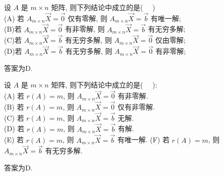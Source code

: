\begin{eg}
设 $A$ 是 $m\times n$ 矩阵,  则下列结论中成立的是(    \ \     )  \\
(A) 若 $A_{m\times n}\vec{X}=\vec{0}$ 仅有零解,   则 $A_{m\times n}\vec{X}=\vec{b}$ 有唯一解;\\
(B)若 $A_{m\times n}\vec{X}=\vec{0}$ 有非零解,   则 $A_{m\times n}\vec{X}=\vec{b}$ 有无穷多解;\\
(C)若 $A_{m\times n}\vec{X}=\vec{b}$ 有无穷多解,   则 $A_{m\times n}\vec{X}=\vec{0}$ 仅由零解;\\
(D)若 $A_{m\times n}\vec{X}=\vec{b}$ 有无穷多解,   则 $A_{m\times n}\vec{X}=\vec{0}$ 有非零解;

答案为D.
\end{eg}


\begin{eg}
设 $A$ 是 $m\times n$ 矩阵,  则下列结论中成立的是( \ \ ):\\
(A) 若 $r(A) = m$,  则 $A_{m\times n}\vec{X}=\vec{0}$  有非零解.\\
(B) 若 $r(A) = m$,  则 $A_{m\times n}\vec{X}=\vec{0}$  仅有非零解.\\
(C) 若 $r(A) = m$,  则 $A_{m\times n}\vec{X}=\vec{b}$  无解.\\
(D) 若 $r(A) = m$,  则 $A_{m\times n}\vec{X}=\vec{b}$ 有解.\\
(E) 若 $r(A) = m$,  则 $A_{m\times n}\vec{X}=\vec{b}$ 有唯一解.
(F) 若 $r(A) = m$,  则 $A_{m\times n}\vec{X}=\vec{b}$ 有无穷多解.

答案为D.
\end{eg}

